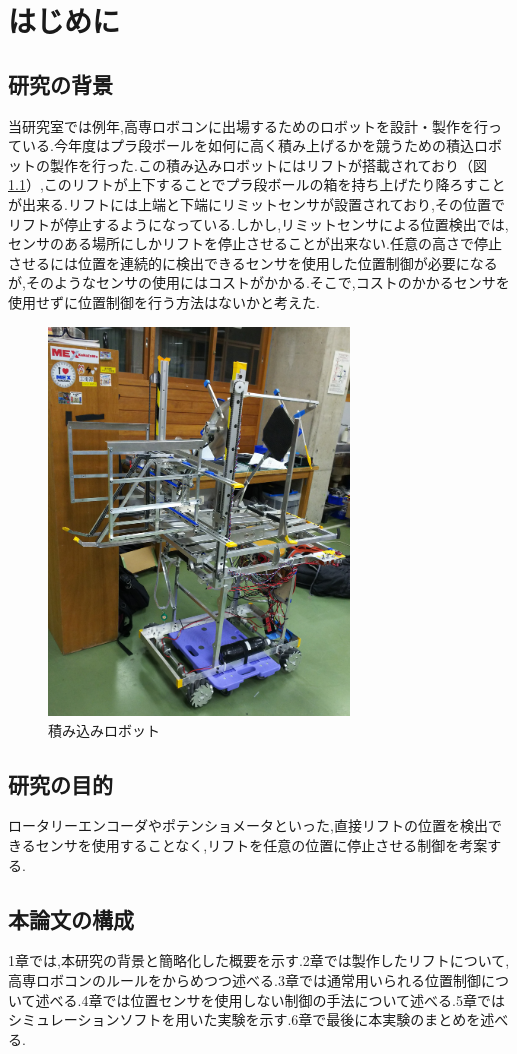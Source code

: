 \chapter{はじめに}

\section{研究の背景}
当研究室では例年,高専ロボコンに出場するためのロボットを設計・製作を行っている.今年度はプラ段ボールを如何に高く積み上げるかを競うための積込ロボットの製作を行った.この積み込みロボットにはリフトが搭載されており（図\ref{fig:robot}）,このリフトが上下することでプラ段ボールの箱を持ち上げたり降ろすことが出来る.リフトには上端と下端にリミットセンサが設置されており,その位置でリフトが停止するようになっている.しかし,リミットセンサによる位置検出では,センサのある場所にしかリフトを停止させることが出来ない.任意の高さで停止させるには位置を連続的に検出できるセンサを使用した位置制御が必要になるが,そのようなセンサの使用にはコストがかかる.そこで,コストのかかるセンサを使用せずに位置制御を行う方法はないかと考えた.

\begin{figure}[htbp]
  \begin{center}
    \includegraphics[width=80mm]{img/robot.JPG}
    \end{center}
  \caption{積み込みロボット}
 \label{fig:robot}
\end{figure}

\section{研究の目的}
ロータリーエンコーダやポテンショメータといった,直接リフトの位置を検出できるセンサを使用することなく,リフトを任意の位置に停止させる制御を考案する.


\section{本論文の構成}
1章では,本研究の背景と簡略化した概要を示す.2章では製作したリフトについて,高専ロボコンのルールをからめつつ述べる.3章では通常用いられる位置制御について述べる.4章では位置センサを使用しない制御の手法について述べる.5章ではシミュレーションソフトを用いた実験を示す.6章で最後に本実験のまとめを述べる.